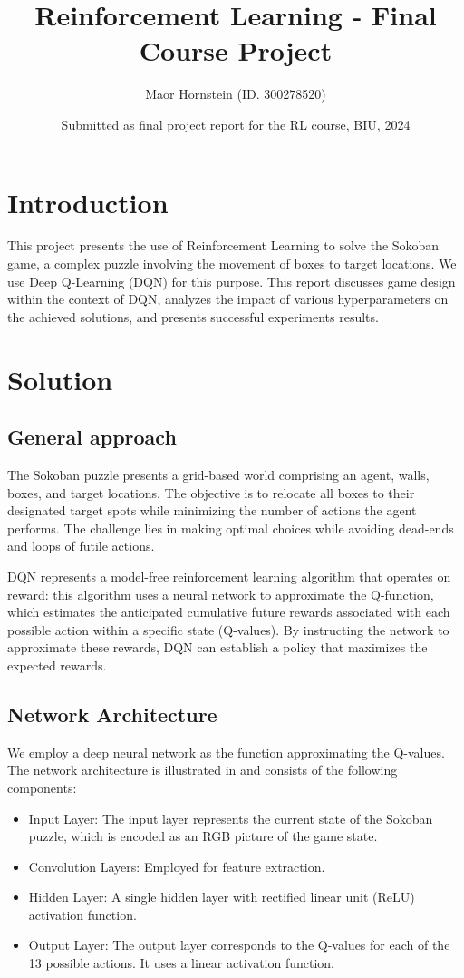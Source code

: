 \documentclass{article}
\title{Reinforcement Learning - Final Course Project}
\author{Maor Hornstein (ID. 300278520)}
\date{Submitted as final project report for the RL course, BIU, 2024}
\begin{document}
\maketitle

\section{Introduction}
This project presents the use of Reinforcement Learning to solve the Sokoban game, a complex puzzle involving the movement of boxes to target locations. We use Deep Q-Learning (DQN) for this purpose. This report discusses game design within the context of DQN, analyzes the impact of various hyperparameters on the achieved solutions, and presents successful experiments results.

\section{Solution}
\subsection{General approach}
The Sokoban puzzle presents a grid-based world comprising an agent, walls, boxes, and target locations. The objective is to relocate all boxes to their designated target spots while minimizing the number of actions the agent performs. The challenge lies in making optimal choices while avoiding dead-ends and loops of futile actions.

DQN represents a model-free reinforcement learning algorithm that operates on reward: this algorithm uses a neural network to approximate the Q-function, which estimates the anticipated cumulative future rewards associated with each possible action within a specific state (Q-values). By instructing the network to approximate these rewards, DQN can establish a policy that maximizes the expected rewards.

\subsection{Network Architecture}

We employ a deep neural network as the function approximating the Q-values. The network  architecture is illustrated in  and consists of the following components:

\begin{itemize}

\item Input Layer: The input layer represents the current state of the Sokoban puzzle, which is encoded as an RGB picture of the game state.
\item Convolution Layers: Employed for feature extraction.
\item Hidden Layer: A single hidden layer with rectified linear unit (ReLU) activation function.
\item Output Layer: The output layer corresponds to the Q-values for each of the 13 possible actions. It uses a linear activation function.
\end{itemize}
\end{document}
